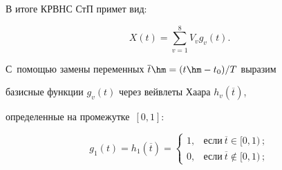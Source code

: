   


  В итоге КРВНС СтП примет вид:


  $$


  X(t)= \sum\limits^8_{v=1} V_v g_v(t).


  $$


  


 


    


С~по\-мощью замены переменных $\overline{t}\hm= (t\hm-t_0)/T$ выразим 


базисные функции $g_v(t)$ через вейвлеты Хаара $h_v(\overline{t})$, 


определенные на промежутке~$[0,1]$:  


$$


  g_1(t)=h_1\left(\overline{t}\right) =


  \begin{cases}


  1, & \mbox{если}\ \overline{t}\in [0,1)\,;\\


  0, & \mbox{если}\ \overline{t}\not\in [0,1)\,;


  \end{cases}


  $$


  


 


  


  


  


  \noindent


